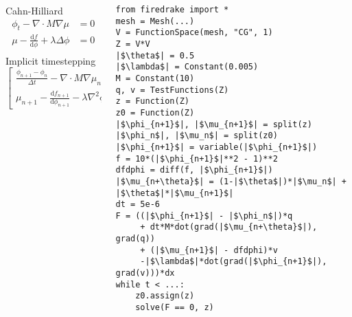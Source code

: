\documentclass[presentation,aspectratio=43]{beamer}
\begin{document}
\begin{frame}[fragile]
  \begin{columns}
    \begin{column}{0.5\textwidth}
      \begin{block}{Cahn-Hilliard}
        \small
        \begin{align*}
          \phi_t - \nabla \cdot M \nabla \mu &= 0\\
          \mu - \frac{\text{d} f}{\text{d} \phi} + \lambda \Delta \phi &= 0\\
        \end{align*}
        Implicit timestepping
        \begin{equation*}
          \begin{bmatrix}
            \frac{\phi_{n+1} - \phi_n}{\Delta t} - \nabla \cdot M \nabla \mu_{n+\theta}\\
            \mu_{n+1} - \frac{\text{d} f_{n+1}}{\text{d} \phi_{n+1}} -
            \lambda \nabla^2\phi_{n+1}
          \end{bmatrix} = 0
        \end{equation*}
      \end{block}
    \end{column}
    \begin{column}{0.5\textwidth}
\begin{verbatim}
from firedrake import *
mesh = Mesh(...)
V = FunctionSpace(mesh, "CG", 1)
Z = V*V
|$\theta$| = 0.5
|$\lambda$| = Constant(0.005)
M = Constant(10)
q, v = TestFunctions(Z)
z = Function(Z)
z0 = Function(Z)
|$\phi_{n+1}$|, |$\mu_{n+1}$| = split(z)
|$\phi_n$|, |$\mu_n$| = split(z0)
|$\phi_{n+1}$| = variable(|$\phi_{n+1}$|)
f = 10*(|$\phi_{n+1}$|**2 - 1)**2
dfdphi = diff(f, |$\phi_{n+1}$|)
|$\mu_{n+\theta}$| = (1-|$\theta$|)*|$\mu_n$| + |$\theta$|*|$\mu_{n+1}$|
dt = 5e-6
F = ((|$\phi_{n+1}$| - |$\phi_n$|)*q
     + dt*M*dot(grad(|$\mu_{n+\theta}$|), grad(q))
     + (|$\mu_{n+1}$| - dfdphi)*v
     -|$\lambda$|*dot(grad(|$\phi_{n+1}$|), grad(v)))*dx
while t < ...:
    z0.assign(z)
    solve(F == 0, z)
\end{verbatim}
    \end{column}
  \end{columns}
\end{frame}
\end{document}

